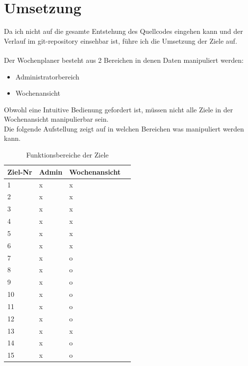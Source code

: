 \section{Umsetzung}
Da ich nicht auf die gesamte Entstehung des Quellcodes eingehen kann und der Verlauf im git-repository einsehbar ist,
führe ich die Umsetzung der Ziele auf.\\\\
Der Wochenplaner besteht aus 2 Bereichen in denen Daten manipuliert werden:
\begin{itemize}
    \item Administratorbereich
    \item Wochenansicht\\
\end{itemize}
Obwohl eine Intuitive Bedienung gefordert ist, müssen nicht alle Ziele in der Wochenansicht manipulierbar sein.\\
Die folgende Aufstellung zeigt auf in welchen Bereichen was manipuliert werden kann.\\

\begin{table}[!ht]
\begin{center}
    \begin{longtable}{llp{3cm}l}
        \toprule Ziel-Nr & Admin & Wochenansicht \\
        \midrule 1 & x & x \\
        \midrule 2 & x & x \\
        \midrule 3 & x & x \\
        \midrule 4 & x & x \\
        \midrule 5 & x & x \\
        \midrule 6 & x & x \\ 
        \midrule 7 & x & o \\
        \midrule 8 & x & o \\
        \midrule 9 & x & o \\
        \midrule 10 & x & o \\
        \midrule 11 & x & o \\
        \midrule 12 & x & o \\
        \midrule 13 & x & x \\
        \midrule 14 & x & o \\
        \midrule 15 & x & o \\
        \bottomrule
        \end{longtable}
    \caption{Funktionsbereiche der Ziele}
    \label{tab:funktionsbereiche_ziele}
\end{center}
\end{table}

